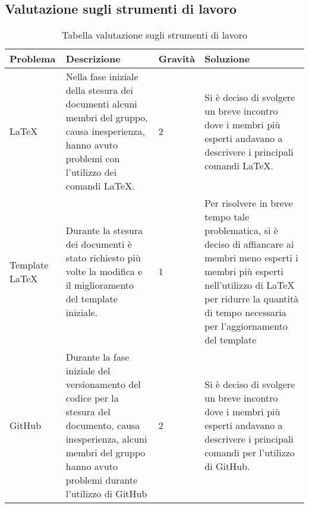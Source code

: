 \subsection{Valutazione sugli strumenti di lavoro}

{

\centering
\renewcommand{\arraystretch}{2}
\begin{longtable}{C{2cm} C{5cm} C{2cm} C{5.2cm}}
\caption{Tabella valutazione sugli strumenti di lavoro}\\
\textbf{Problema} &
\textbf{Descrizione}&
\textbf{Gravità}&
\textbf{Soluzione}\\
\endhead


\LaTeX & Nella fase iniziale della stesura dei documenti alcuni membri del gruppo, causa inesperienza, hanno avuto problemi con l'utilizzo dei comandi \LaTeX{}. & 2 & Si è deciso di svolgere un breve incontro dove i membri più esperti andavano a descrivere i principali comandi \LaTeX{}. \\
Template \LaTeX & Durante la stesura dei documenti è stato richiesto più volte la modifica e il miglioramento del template iniziale. & 1 & Per risolvere in breve tempo tale problematica, si è deciso di affiancare ai membri meno esperti i membri più esperti nell'utilizzo di \LaTeX{} per ridurre la quantità di tempo necessaria per l'aggiornamento del template \\
GitHub & Durante la fase iniziale del versionamento del codice per la stesura del documento, causa inesperienza, alcuni membri del gruppo hanno avuto problemi durante l'utilizzo di GitHub & 2 & Si è deciso di svolgere un breve incontro dove i membri più esperti andavano a descrivere i principali comandi per l'utilizzo di GitHub.\\


\end{longtable}
}